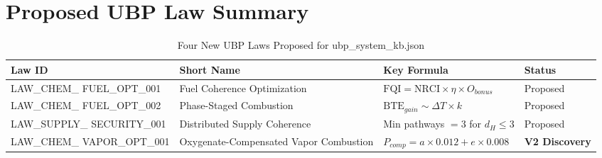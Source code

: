 \documentclass[12pt,a4paper]{article}
\begin{document}
\section{Proposed UBP Law Summary}

\begin{table}[H]
\centering
\caption{Four New UBP Laws Proposed for ubp\_system\_kb.json}
\label{tab:laws}
\begin{tabular}{@{}L{3.2cm} L{3.5cm} L{4.5cm} C{1.8cm}@{}}
\toprule
\textbf{Law ID} & \textbf{Short Name} & \textbf{Key Formula} & \textbf{Status} \\
\midrule
LAW\_CHEM\_ FUEL\_OPT\_001 & Fuel Coherence Optimization &
  $\text{FQI} = \text{NRCI} \times \eta \times O_{bonus}$ & Proposed \\
LAW\_CHEM\_ FUEL\_OPT\_002 & Phase-Staged Combustion &
  $\text{BTE}_{gain} \sim \Delta T \times k$ & Proposed \\
LAW\_SUPPLY\_ SECURITY\_001 & Distributed Supply Coherence &
  Min pathways $= 3$ for $d_H \leq 3$ & Proposed \\
LAW\_CHEM\_ VAPOR\_OPT\_001 & Oxygenate-Compensated Vapor Combustion &
  $P_{comp} = a \times 0.012 + e \times 0.008$ & \textbf{V2 Discovery} \\
\bottomrule
\end{tabular}
\end{table}

\newpage
\end{document}
